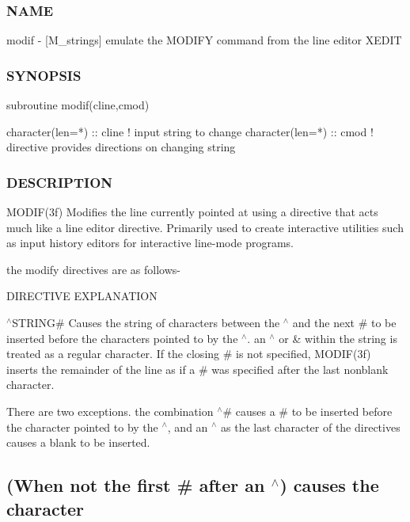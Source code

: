 \subsubsection*{N\+A\+ME}

modif -\/ \mbox{[}M\+\_\+strings\mbox{]} emulate the M\+O\+D\+I\+FY command from the line editor X\+E\+D\+IT 

\subsubsection*{S\+Y\+N\+O\+P\+S\+IS}

\begin{DoxyVerb}subroutine modif(cline,cmod)

 character(len=*) :: cline ! input string to change
 character(len=*) :: cmod  ! directive provides directions on changing string
\end{DoxyVerb}


\subsubsection*{D\+E\+S\+C\+R\+I\+P\+T\+I\+ON}

M\+O\+D\+I\+F(3f) Modifies the line currently pointed at using a directive that acts much like a line editor directive. Primarily used to create interactive utilities such as input history editors for interactive line-\/mode programs.

the modify directives are as follows-\/

D\+I\+R\+E\+C\+T\+I\+VE E\+X\+P\+L\+A\+N\+A\+T\+I\+ON

$^\wedge$\+S\+T\+R\+I\+NG\# Causes the string of characters between the $^\wedge$ and the next \# to be inserted before the characters pointed to by the $^\wedge$. an $^\wedge$ or \& within the string is treated as a regular character. If the closing \# is not specified, M\+O\+D\+I\+F(3f) inserts the remainder of the line as if a \# was specified after the last nonblank character.

There are two exceptions. the combination $^\wedge$\# causes a \# to be inserted before the character pointed to by the $^\wedge$, and an $^\wedge$ as the last character of the directives causes a blank to be inserted.

\subsection*{(When not the first \# after an $^\wedge$) causes the character}

